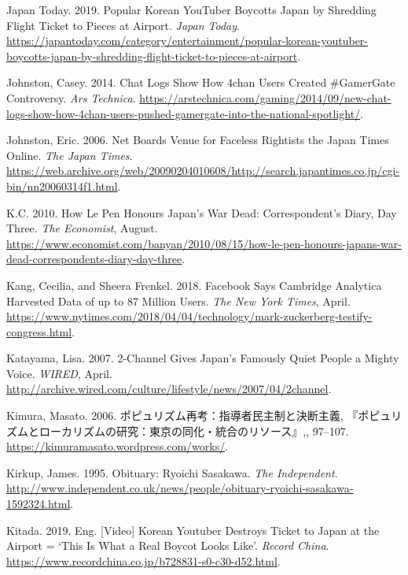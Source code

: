 \documentclass[10pt,british,A4paper,,openany]{memoir}
\begin{document}
\hypertarget{ref-japan_today_popular_2019}{}
Japan Today. 2019. Popular Korean YouTuber Boycotts Japan by Shredding
Flight Ticket to Pieces at Airport. \emph{Japan Today}.
\url{https://japantoday.com/category/entertainment/popular-korean-youtuber-boycotts-japan-by-shredding-flight-ticket-to-pieces-at-airport}.

\hypertarget{ref-johnston_chat_2014}{}
Johnston, Casey. 2014. Chat Logs Show How 4chan Users Created
\#GamerGate Controversy. \emph{Ars Technica}.
\url{https://arstechnica.com/gaming/2014/09/new-chat-logs-show-how-4chan-users-pushed-gamergate-into-the-national-spotlight/}.

\hypertarget{ref-johnston_net_2006}{}
Johnston, Eric. 2006. Net Boards Venue for Faceless Rightists the Japan
Times Online. \emph{The Japan Times}.
\url{https://web.archive.org/web/20090204010608/http://search.japantimes.co.jp/cgi-bin/nn20060314f1.html}.

\hypertarget{ref-k.c._how_2010}{}
K.C. 2010. How Le Pen Honours Japan's War Dead: Correspondent's Diary,
Day Three. \emph{The Economist}, August.
\url{https://www.economist.com/banyan/2010/08/15/how-le-pen-honours-japans-war-dead-correspondents-diary-day-three}.

\hypertarget{ref-kang_facebook_2018}{}
Kang, Cecilia, and Sheera Frenkel. 2018. Facebook Says Cambridge
Analytica Harvested Data of up to 87 Million Users. \emph{The New York
Times}, April.
\url{https://www.nytimes.com/2018/04/04/technology/mark-zuckerberg-testify-congress.html}.

\hypertarget{ref-katayama_2-channel_2007}{}
Katayama, Lisa. 2007. 2-Channel Gives Japan's Famously Quiet People a
Mighty Voice. \emph{WIRED}, April.
\url{http://archive.wired.com/culture/lifestyle/news/2007/04/2channel}.

\hypertarget{ref-kimura__2006}{}
Kimura, Masato. 2006. ポピュリズム再考：指導者民主制と決断主義,
『ポピュリズムとローカリズムの研究：東京の同化・統合のリソース』,,
97--107. \url{https://kimuramasato.wordpress.com/works/}.

\hypertarget{ref-kirkup_obituary:_1995}{}
Kirkup, James. 1995. Obituary: Ryoichi Sasakawa. \emph{The Independent}.
\url{http://www.independent.co.uk/news/people/obituary-ryoichi-sasakawa-1592324.html}.

\hypertarget{ref-kitada_eng._2019}{}
Kitada. 2019. Eng. {[}Video{]} Korean Youtuber Destroys Ticket to Japan
at the Airport = `This Is What a Real Boycot Looks Like'. \emph{Record
China}. \url{https://www.recordchina.co.jp/b728831-s0-c30-d52.html}.
\end{document}
